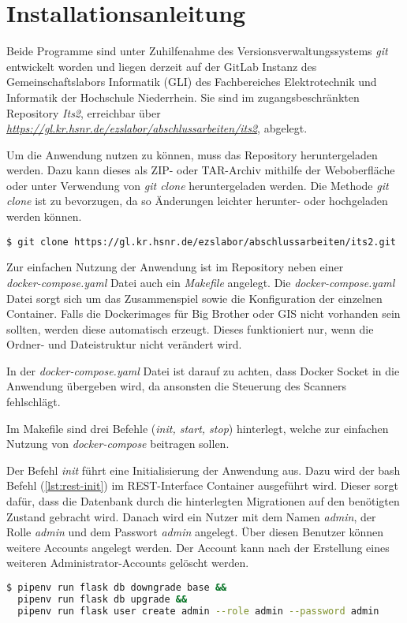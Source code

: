 \section{Installationsanleitung}
Beide Programme sind unter Zuhilfenahme des Versionsverwaltungssystems \textit{git} entwickelt worden und liegen derzeit auf der GitLab Instanz des Gemeinschaftslabors Informatik (GLI) des Fachbereiches Elektrotechnik und Informatik der Hochschule Niederrhein. Sie sind im zugangsbeschränkten Repository \textit{Its2}, erreichbar über\\ \textit{\url{https://gl.kr.hsnr.de/ezslabor/abschlussarbeiten/its2}}, abgelegt.

Um die Anwendung nutzen zu können, muss das Repository heruntergeladen werden.
Dazu kann dieses als ZIP- oder TAR-Archiv mithilfe der Weboberfläche oder unter Verwendung von \textit{git clone} heruntergeladen werden. Die Methode \textit{git clone} ist zu bevorzugen, da so Änderungen leichter herunter- oder hochgeladen werden können.

\begin{lstlisting}[caption={git clone (bash)}, captionpos=b, label={lst:git-clone}]
$ git clone https://gl.kr.hsnr.de/ezslabor/abschlussarbeiten/its2.git
\end{lstlisting}

Zur einfachen Nutzung der Anwendung ist im Repository neben einer \\
\textit{docker-compose.yaml} Datei auch ein \textit{Makefile} angelegt. Die \textit{docker-compose.yaml} Datei sorgt sich um das Zusammenspiel sowie die Konfiguration der einzelnen Container. Falls die Dockerimages für Big Brother oder GIS nicht vorhanden sein sollten, werden diese automatisch erzeugt. Dieses funktioniert nur, wenn die Ordner- und Dateistruktur nicht verändert wird.

In der \textit{docker-compose.yaml} Datei ist darauf zu achten, dass Docker Socket in die Anwendung übergeben wird, da ansonsten die Steuerung des Scanners fehlschlägt.

Im Makefile sind drei Befehle (\textit{init, start, stop}) hinterlegt, welche zur einfachen Nutzung von \textit{docker-compose} beitragen sollen.

Der Befehl \textit{init} führt eine Initialisierung der Anwendung aus. Dazu wird der bash Befehl (\ref{lst:rest-init}) im REST-Interface Container ausgeführt wird.
Dieser sorgt dafür, dass die Datenbank durch die hinterlegten Migrationen auf den benötigten Zustand gebracht wird. Danach wird ein Nutzer mit dem Namen \textit{admin}, der Rolle \textit{admin} und dem Passwort \textit{admin} angelegt. Über diesen Benutzer können weitere Accounts angelegt werden. Der Account kann nach der Erstellung eines weiteren Administrator-Accounts gelöscht werden.
\begin{lstlisting}[language=bash, caption={Initalisierung REST-Interface (bash)}, captionpos=b, label={lst:rest-init}]
$ pipenv run flask db downgrade base && 
  pipenv run flask db upgrade && 
  pipenv run flask user create admin --role admin --password admin
\end{lstlisting}

